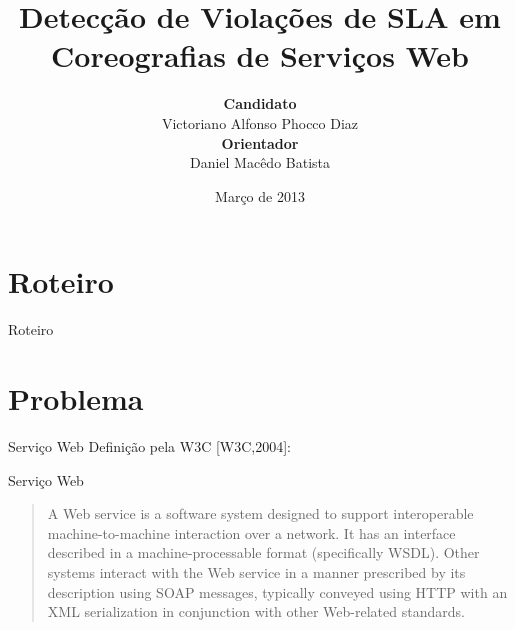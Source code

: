 \documentclass[xcolor=svgnames]{beamer}
\title[Defesa de Mestrado]
    {Detecção de Violações de SLA em Coreografias de Serviços Web}
\author[V. A. Phocco-Diaz]
	{
		{\bf Candidato} \\
		Victoriano Alfonso Phocco Diaz \\%
		{\bf Orientador} \\  Daniel Macêdo Batista 	\\
	}
\institute[IME-USP]
	{Instituto de Matemática e Estatística \\
	 Departamento de Ciência da Computação \\	
	 Universidade de São Paulo  \\  [1ex]
	}
\date[Março 2013]{Março de 2013}
\begin{document}

\begin{frame}[plain]
\titlepage
\end{frame}

\section*{Roteiro}
    \begin{frame}{Roteiro}
        \tableofcontents
    \end{frame}


\section{Problema}

    \begin{frame}{Serviço Web}
    	Definição pela W3C [W3C,2004]: %
    	\begin{block}{Serviço Web}\vspace{-.3\baselineskip}
        	 \begin{quote}
                 A Web service is a software system designed to support interoperable machine-to-machine interaction over a network. It has an
 interface described in a machine-processable format (specifically WSDL). Other systems interact with the Web service in a manner
prescribed by its description using SOAP messages, typically conveyed using HTTP with an XML serialization in conjunction with other Web-related standards.
        	 \end{quote}
    	\end{block}
     \tiny{
      }
    \end{frame}
\end{document}
